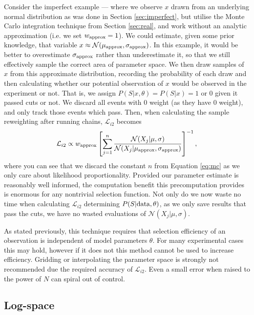 \documentclass[a4paper,fleqn,usenatbib]{mnras}
\begin{document}
Consider the imperfect example --- where we observe $x$ drawn from an underlying normal distribution as was done in Section \ref{sec:imperfect}, but utilise the Monte Carlo integration technique from Section \ref{sec:real}, and work without an analytic approximation (i.e. we set $w_{\rm approx} =1$). We could estimate, given some prior knowledge, that variable $x \approx \mathcal{N}(\mu_{\rm approx}, \sigma_{\rm approx})$. In this example, it would be better to overestimate $\sigma_{\rm approx}$ rather than underestimate it, so that we still effectively sample the correct area of parameter space. We then draw samples of $x$ from this approximate distribution, recording the probability of each draw and then calculating whether our potential observation of $x$ would be observed in the experiment or not. That is, we assign $P(S|x,\theta) = P(S|x) = 1$ or $0$ given it passed cuts or not. We discard all events with $0$ weight (as they have $0$ weight), and only track those events which pass. Then, when calculating the sample reweighting after running chains, $\mathcal{L}_{i2}$ becomes
\begin{align}
\mathcal{L}_{i2} \propto w_{\rm approx}  \left[\sum_{j=1}^{n} \frac{\mathcal{N}(X_j | \mu, \sigma)}{\mathcal{N}(X_j | \mu_{\rm approx}, \sigma_{\rm approx})} \right]^{-1},
\end{align} 
where you can see that we discard the constant $n$ from Equation \eqref{eq:mc} as we only care about likelihood proportionality. Provided our parameter estimate is reasonably well informed, the computation benefit this precomputation provides is enormous for any nontrivial selection function. Not only do we now waste no time when calculating $\mathcal{L}_{i2}$ determining $P(S|{\rm data}, \theta)$, as we only save results that pass the cuts, we have no wasted evaluations of $\mathcal{N}(X_j | \mu, \sigma)$.

As stated previously, this technique requires that selection efficiency of an observation is independent of model parameters $\theta$. For many experimental cases this may hold, however if it does not this method cannot be used to increase efficiency. Gridding or interpolating the parameter space is strongly not recommended due the required accuracy of $\mathcal{L}_{i2}$. Even a small error when raised to the power of $N$ can spiral out of control.

\subsection{Log-space}
\end{document}
